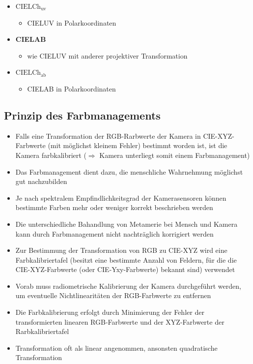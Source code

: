 \documentclass[11pt]{article}
\begin{document}
\begin{itemize}
\begin{itemize}
    \end{itemize}
    \item \textbf{$\text{CIELCh}_\text{uv}$}
        \begin{itemize}
            \item CIELUV in Polarkoordinaten
        \end{itemize}
    \item \textbf{CIELAB}
    \begin{itemize}
        \item wie CIELUV mit anderer projektiver Transformation
    \end{itemize}
    \item \textbf{$\text{CIELCh}_\text{ab}$}
    \begin{itemize}
        \item  CIELAB in Polarkoordinaten
    \end{itemize}
    
\end{itemize}

\subsection{Prinzip des Farbmanagements}

\begin{itemize}
    \item Falls eine Transformation der RGB-Rarbwerte der Kamera in CIE-XYZ-Farbwerte (mit möglichst kleinem Fehler) bestimmt worden ist, ist die Kamera farbkalibriert ($\Rightarrow$ Kamera unterliegt somit einem Farbmanagement)
    \item Das Farbmanagement dient dazu, die menschliche Wahrnehmung möglichst gut nachzubilden
    \item Je nach spektralem Empfindlichkeitsgrad der Kamerasensoren können bestimmte Farben mehr oder weniger korrekt beschrieben werden
    \item Die unterschiedliche Bahandlung von Metamerie bei Mensch und Kamera kann durch Farbmanagement nicht nachträglich korrigiert werden
    \item Zur Bestimmung der Transformation von RGB zu CIE-XYZ wird eine Farbkalibriertafel (besitzt eine bestimmte Anzahl von Feldern, für die die CIE-XYZ-Farbwerte (oder CIE-Yxy-Farbwerte) bekannt sind) verwendet
    \item Vorab muss radiometrische Kalibrierung der Kamera durchgeführt werden, um eventuelle Nichtlinearitäten der RGB-Farbwerte zu entfernen
    \item Die Farbkalibrierung erfolgt durch Minimierung der Fehler der transformierten linearen RGB-Farbwerte und der XYZ-Farbwerte der Rarbkalibriertafel
    \item Transformation oft als linear angenommen, ansonsten quadratische Transformation
\end{itemize}
\end{document}

